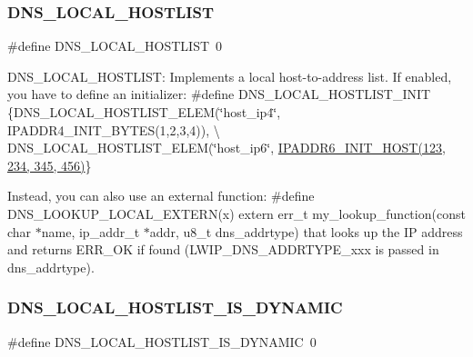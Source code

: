 \subsubsection{\texorpdfstring{D\+N\+S\+\_\+\+L\+O\+C\+A\+L\+\_\+\+H\+O\+S\+T\+L\+I\+ST}{DNS\_LOCAL\_HOSTLIST}\hspace{0.1cm}{\footnotesize\ttfamily [2/2]}}
{\footnotesize\ttfamily \#define D\+N\+S\+\_\+\+L\+O\+C\+A\+L\+\_\+\+H\+O\+S\+T\+L\+I\+ST~0}

D\+N\+S\+\_\+\+L\+O\+C\+A\+L\+\_\+\+H\+O\+S\+T\+L\+I\+ST\+: Implements a local host-\/to-\/address list. If enabled, you have to define an initializer\+: \#define D\+N\+S\+\_\+\+L\+O\+C\+A\+L\+\_\+\+H\+O\+S\+T\+L\+I\+S\+T\+\_\+\+I\+N\+IT \{D\+N\+S\+\_\+\+L\+O\+C\+A\+L\+\_\+\+H\+O\+S\+T\+L\+I\+S\+T\+\_\+\+E\+L\+EM(\char`\"{}host\+\_\+ip4\char`\"{}, I\+P\+A\+D\+D\+R4\+\_\+\+I\+N\+I\+T\+\_\+\+B\+Y\+T\+E\+S(1,2,3,4)), \textbackslash{} D\+N\+S\+\_\+\+L\+O\+C\+A\+L\+\_\+\+H\+O\+S\+T\+L\+I\+S\+T\+\_\+\+E\+L\+EM(\char`\"{}host\+\_\+ip6\char`\"{}, \hyperlink{openmote-cc2538_2lwip_2src_2include_2lwip_2ip__addr_8h_adaff748da2b808995993dd3db5420f08}{I\+P\+A\+D\+D\+R6\+\_\+\+I\+N\+I\+T\+\_\+\+H\+O\+S\+T(123, 234, 345, 456)}\}

Instead, you can also use an external function\+: \#define D\+N\+S\+\_\+\+L\+O\+O\+K\+U\+P\+\_\+\+L\+O\+C\+A\+L\+\_\+\+E\+X\+T\+E\+R\+N(x) extern err\+\_\+t my\+\_\+lookup\+\_\+function(const char $\ast$name, ip\+\_\+addr\+\_\+t $\ast$addr, u8\+\_\+t dns\+\_\+addrtype) that looks up the IP address and returns E\+R\+R\+\_\+\+OK if found (L\+W\+I\+P\+\_\+\+D\+N\+S\+\_\+\+A\+D\+D\+R\+T\+Y\+P\+E\+\_\+xxx is passed in dns\+\_\+addrtype). \mbox{\label{group__lwip__opts__dns_ga8235a5fb0a1c1cceeee670cf95612ba8}} 
\subsubsection{\texorpdfstring{D\+N\+S\+\_\+\+L\+O\+C\+A\+L\+\_\+\+H\+O\+S\+T\+L\+I\+S\+T\+\_\+\+I\+S\+\_\+\+D\+Y\+N\+A\+M\+IC}{DNS\_LOCAL\_HOSTLIST\_IS\_DYNAMIC}\hspace{0.1cm}{\footnotesize\ttfamily [1/2]}}
{\footnotesize\ttfamily \#define D\+N\+S\+\_\+\+L\+O\+C\+A\+L\+\_\+\+H\+O\+S\+T\+L\+I\+S\+T\+\_\+\+I\+S\+\_\+\+D\+Y\+N\+A\+M\+IC~0}


